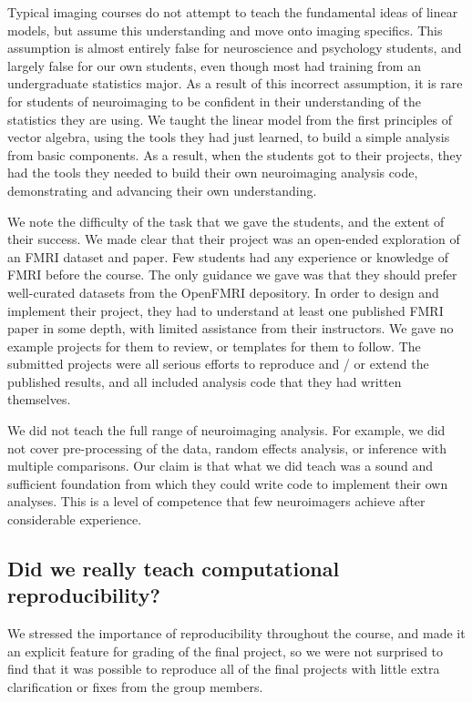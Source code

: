 Typical imaging courses do not attempt to
teach the fundamental ideas of linear models, but assume this understanding
and move onto imaging specifics.  This assumption is almost entirely false for
neuroscience and psychology students, and largely false for our own
students, even though most had training from an undergraduate
statistics major. As a result of this incorrect assumption, it is rare for
students of neuroimaging to be confident in their understanding of the
statistics they are using.  We taught the linear model from the first
principles of vector algebra, using the tools they had just learned, to build
a simple analysis from basic components.  As a result, when the students got
to their projects, they had the tools they needed to build their own
neuroimaging analysis code, demonstrating and advancing their own
understanding.

We note the difficulty of the task that we gave the students, and the
extent of their success.  We made clear that their project was an open-ended
exploration of an FMRI dataset and paper.  Few students had any
experience or knowledge of FMRI before the course. The only guidance we gave
was that they should prefer well-curated datasets from the OpenFMRI
depository.  In order to design and implement their project, they had to
understand at least one published FMRI paper in some depth, with limited
assistance from their instructors.  We gave no example projects for them to
review, or templates for them to follow.  The submitted projects were all serious efforts to reproduce and
/ or extend the published results, and all included analysis code that they
had written themselves.

We did not teach the full range of neuroimaging analysis.  For example, we did
not cover pre-processing of the data, random effects analysis, or inference
with multiple comparisons.   Our claim is that what we did teach was a sound
and sufficient foundation from which they could write code to implement their
own analyses.  This is a level of competence that few neuroimagers achieve
after considerable experience.

\subsection{Did we really teach computational reproducibility?}

We stressed the importance of reproducibility throughout the course, and
made it an explicit feature for grading of the final project, so we were not
surprised to find that it was possible to reproduce all of the final projects
with little extra clarification or fixes from the group members.

